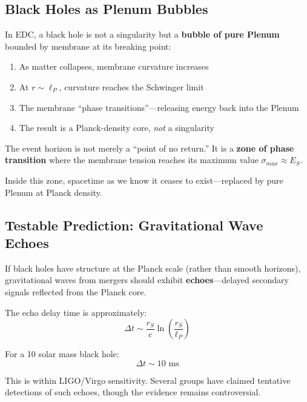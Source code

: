 \subsection{Black Holes as Plenum Bubbles}

In EDC, a black hole is not a singularity but a \textbf{bubble of pure Plenum} bounded by membrane at its breaking point:

\begin{enumerate}
    \item As matter collapses, membrane curvature increases
    \item At $r \sim \ell_P$, curvature reaches the Schwinger limit
    \item The membrane ``phase transitions''---releasing energy back into the Plenum
    \item The result is a Planck-density core, \textit{not} a singularity
\end{enumerate}

\begin{tcolorbox}[colback=yellow!10,colframe=orange!80!black,title=The Elastic Horizon]
The event horizon is not merely a ``point of no return.'' It is a \textbf{zone of phase transition} where the membrane tension reaches its maximum value $\sigma_{max} \approx E_S$.

Inside this zone, spacetime as we know it ceases to exist---replaced by pure Plenum at Planck density.
\end{tcolorbox}

\subsection{Testable Prediction: Gravitational Wave Echoes}

If black holes have structure at the Planck scale (rather than smooth horizons), gravitational waves from mergers should exhibit \textbf{echoes}---delayed secondary signals reflected from the Planck core.

The echo delay time is approximately:
\begin{equation}
\Delta t \sim \frac{r_S}{c} \ln\left(\frac{r_S}{\ell_P}\right)
\end{equation}

For a 10 solar mass black hole:
\begin{equation}
\Delta t \sim 10 \text{ ms}
\end{equation}

This is within LIGO/Virgo sensitivity. Several groups have claimed tentative detections of such echoes, though the evidence remains controversial.


